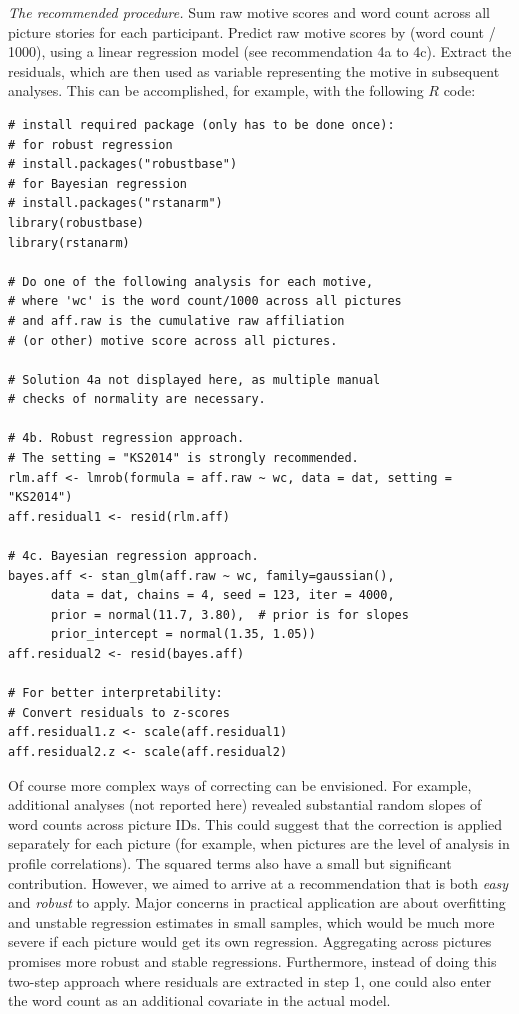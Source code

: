 \documentclass[jou,a4paper]{apa6}\usepackage[]{graphicx}\usepackage[]{color}
\begin{document}
\emph{The recommended procedure.} Sum raw motive scores and word count across all picture stories for each participant. Predict raw motive scores by (word count / 1000), using a linear regression model (see recommendation 4a to 4c). Extract the residuals, which are then used as variable representing the motive in subsequent analyses. This can be accomplished, for example, with the following $R$ code:

\begin{lstlisting}
# install required package (only has to be done once):
# for robust regression
# install.packages("robustbase")  
# for Bayesian regression
# install.packages("rstanarm")
library(robustbase)
library(rstanarm)

# Do one of the following analysis for each motive,
# where 'wc' is the word count/1000 across all pictures
# and aff.raw is the cumulative raw affiliation 
# (or other) motive score across all pictures.

# Solution 4a not displayed here, as multiple manual
# checks of normality are necessary.

# 4b. Robust regression approach. 
# The setting = "KS2014" is strongly recommended.
rlm.aff <- lmrob(formula = aff.raw ~ wc, data = dat, setting = "KS2014")
aff.residual1 <- resid(rlm.aff)

# 4c. Bayesian regression approach.
bayes.aff <- stan_glm(aff.raw ~ wc, family=gaussian(), 
      data = dat, chains = 4, seed = 123, iter = 4000,
      prior = normal(11.7, 3.80),  # prior is for slopes
      prior_intercept = normal(1.35, 1.05))
aff.residual2 <- resid(bayes.aff)

# For better interpretability: 
# Convert residuals to z-scores
aff.residual1.z <- scale(aff.residual1)
aff.residual2.z <- scale(aff.residual2)
\end{lstlisting}

Of course more complex ways of correcting can be envisioned. For example, additional analyses (not reported here) revealed substantial random slopes of word counts across picture IDs. This could suggest that the correction is applied separately for each picture (for example, when pictures are the level of analysis in profile correlations). The squared terms also have a small but significant contribution. However, we aimed to arrive at a recommendation that is both \emph{easy} and \emph{robust} to apply. Major concerns in practical application are about overfitting and unstable regression estimates in small samples, which would be much more severe if each picture would get its own regression. Aggregating across pictures promises more robust and stable regressions. Furthermore, instead of doing this two-step approach where residuals are extracted in step 1, one could also enter the word count as an additional covariate in the actual model.
\end{document}

